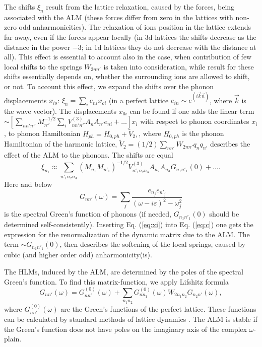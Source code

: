  
The shifts $\xi_n$ result from the lattice relaxation, caused by the
forces, being  associated
with the ALM (these forces differ from zero in the lattices 
with non-zero odd anharmonicities). The relaxation of ions position 
in the lattice extends far away, even if 
the forces appear locally (in 3d lattices the shifts decrease as the 
distance in the power $-3$; in 1d lattices they do not decrease 
with the distance at all). This effect is essential to 
account also in the case, when  contribution of few local 
shifts to the springs $W_{2nn'}$ is taken into consideration, while 
result for these shifts essentially depends on, whether the surrounding
ions are allowed to shift, or not. 
To account this effect, we expand the shifts over the phonon displacements 
$x_{io}$: 
$\xi_n= \sum_i e_{ni} x_{oi}$
(in a perfect lattice $e_{in} \sim e^{(i\vec{k} \vec{n})}$, where $\vec{k}$
is the wave vector).  The displacements $x_{0i}$  can be found
if one adds the linear term   $\sim [\sum_{n n' n''} M_{n''}^{-1/2}\sum_i
 V^{(3)}_{n n' n''} A_n A_{n'} e_{ni} + \ldots] x_i$ with respect to 
phonon coordinates $x_i$, to phonon Hamiltonian
$H_{ph} = H_{0,ph} + \tilde{V}_2,$, where $H_{0,ph}$
is the phonon Hamiltonian of the harmonic lattice, 
$\tilde{V}_2  = (1/2) \sum_{nn'}W_{2 n n'}q_n q_{n'} $
describes the effect of the ALM to the phonons.  The shifts are equal
\begin{equation}
\xi_{n_{1}}\approx  \sum_{n'_{1} n_{2} n_{3}}
 (M_{n_{1}} M_{n'_{1}})^{-1/2} V^{(3)}_{n'_{1} n_{2} n_{3}} 
A_{n_{2}} A_{n_{3}}
G_{n_{1} n'_{1}}(0) + \ldots. \label{eq:xi}
\end{equation}
Here and below 
$$
G_{n n'} (\omega) = \sum_j \frac{e_{n_{j}} e_{n'_{j}}}{(\omega -
i \varepsilon)^2 - \omega_{j}^2}
$$
is the spectral Green's function of phonons
\cite{economou,maradudin} (if needed, $G_{n_{1} n'_{1}}(0)$ 
 should be determined self-consistently).
Inserting Eq. (\ref{eq:xi}) into Eq. (\ref{eq:c}) one gets the expression 
for the  renormalization of the dynamic matrix due to the ALM. The term
$\sim G_{n_1 n'_1}(0)$, then describes the softening of the local springs,
caused by cubic (and higher order odd) anharmonicity(is).  

The HLMs, induced by the ALM, are determined by the poles of the spectral 
Green's function. 
To find this  matrix-function, we apply Lifshitz formula 
\begin{equation}
G_{nn'}(\omega) = G_{nn'}^{(0)}(\omega) + \sum_{n_1 n_2} 
G^{(0)}_{nn_1}(\omega) W_{2n_1 n_2} 
G_{n_{2} n' }(\omega),
\end{equation}
where $G_{nn'}^{(0)}(\omega)$ are the Green's functions of the perfect 
lattice. These functions can be calculated by standard methods of lattice 
dynamics \cite{maradudin}. 
The ALM is stable if the Green's function does not have poles 
on the imaginary axis of the complex $\omega$-plain.


